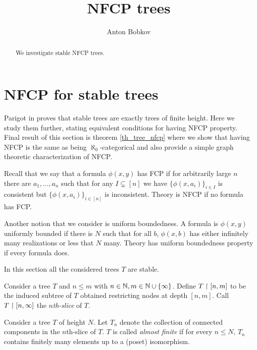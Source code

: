 \documentclass{amsart}
\begin{document}
\title{NFCP trees}
\author{Anton Bobkov}

\begin{abstract}
	We investigate stable NFCP trees. 
\end{abstract}

\maketitle

\section{NFCP for stable trees}
Parigot in \cite{parigot_trees} proves that stable trees are exactly trees of finite height. Here we study them further, stating equivalent conditions for having NFCP property. Final result of this section is theorem \ref{th_tree_nfcp} where we show that having NFCP is the same as being $\aleph_0$-categorical and also provide a simple graph theoretic characterization of NFCP.

Recall that we say that a formula $\phi(x, y)$ has FCP if for arbitrarily large $n$ there are $a_1, \ldots, a_n$ such that for any $I \subsetneq [n]$ we have $\{\phi(x, a_i)\}_{i \in I}$ is consistent but $\{\phi(x, a_i)\}_{i \in [n]}$ is inconsistent. Theory is NFCP if no formula has FCP.

Another notion that we consider is uniform boundedness. A formula is $\phi(x,y)$ uniformly bounded if there is $N$ such that for all $b$, $\phi(x, b)$ has either infinitely many realizations or less that $N$ many. Theory has uniform boundedness property if every formula does.

In this section all the considered trees $T$ are stable.

\begin{Definition}
Consider a tree $T$ and $n \leq m$ with $n \in \mathbb{N}, m \in \mathbb{N} \cup \{\infty\}$. Define $T \upharpoonright [n,m]$ to be the induced subtree of $T$ obtained restricting nodes at depth $[n,m]$. Call $T \upharpoonright [n, \infty]$ the \emph{$n$th-slice} of $T$.
\end{Definition}

\begin{Definition}
	Consider a tree $T$ of height $N$. Let $T_n$ denote the collection of connected components in the $n$th-slice of $T$. $T$ is called \emph{almost finite} if for every $n \leq N$, $T_n$ contains finitely many elements up to a (poset) isomorphism.
\end{Definition}
\end{document}
